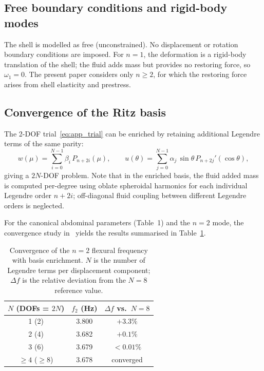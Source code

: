 \subsection{Free boundary conditions and rigid-body modes}
\label{sec:appendix_bcs}

The shell is modelled as free (unconstrained).  No displacement or rotation
boundary conditions are imposed.  For $n=1$, the deformation is a rigid-body
translation of the shell; the fluid adds mass but provides no restoring force,
so $\omega_1=0$.  The present paper considers only $n\geq 2$, for which the
restoring force arises from shell elasticity and prestress.

\subsection{Convergence of the Ritz basis}
\label{sec:appendix_convergence}

The 2-DOF trial~\eqref{eq:app_trial} can be enriched by retaining additional
Legendre terms of the same parity:
\begin{equation}
  w(\mu) = \sum_{i=0}^{N-1}\beta_i\,P_{n+2i}(\mu), \qquad
  u(\theta) = \sum_{j=0}^{N-1}\alpha_j\,\sin\theta\,P_{n+2j}'(\cos\theta),
  \label{eq:app_enriched}
\end{equation}
giving a $2N$-DOF problem.  Note that in the enriched basis, the fluid
added mass is computed per-degree using oblate spheroidal harmonics for each
individual Legendre order $n+2i$; off-diagonal fluid coupling between
different Legendre orders is neglected.

For the canonical abdominal parameters (Table~1) and the $n=2$ mode, the
convergence study in~\cite{BrowntoneP1} yields the results summarised in
Table~\ref{tab:app_convergence}.

\begin{table}[h]
  \centering
  \small
  \caption{Convergence of the $n=2$ flexural frequency with basis enrichment.
    $N$ is the number of Legendre terms per displacement component;
    $\Delta f$ is the relative deviation from the $N=8$ reference value.}
  \label{tab:app_convergence}
  \renewcommand{\arraystretch}{1.1}
  \begin{tabular}{@{}ccc@{}}
    \toprule
    $N$ (DOFs = $2N$) & $f_2$ (Hz) & $\Delta f$ vs.\ $N{=}8$ \\
    \midrule
    1 \phantom{0}(2)  & 3.800 & $+3.3\%$ \\
    2 \phantom{0}(4)  & 3.682 & $+0.1\%$ \\
    3 \phantom{0}(6)  & 3.679 & $<0.01\%$ \\
    $\geq 4$ \phantom{0}($\geq 8$) & 3.678 & converged \\
    \bottomrule
  \end{tabular}
\end{table}

